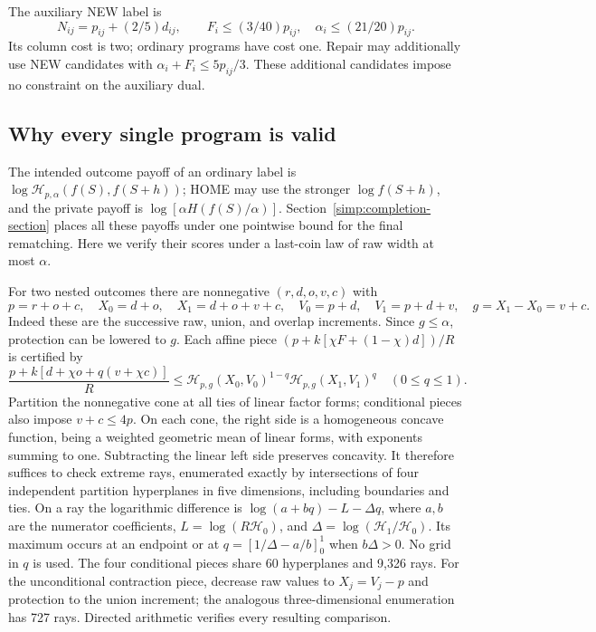 The auxiliary NEW label is
\begin{equation}\label{simp:new-score}
 N_{ij}=p_{ij}+(2/5)d_{ij},\qquad
 F_i\le(3/40)p_{ij},\quad\alpha_i\le(21/20)p_{ij}.
\end{equation}
Its column cost is two; ordinary programs have cost one.
Repair may additionally use NEW candidates with $\alpha_i+F_i\le5p_{ij}/3$.
These additional candidates impose no constraint on the auxiliary dual.

\subsection{Why every single program is valid}

The intended outcome payoff of an ordinary label is
$\log\mathcal H_{p,\alpha}(f(S),f(S+h))$; HOME may use the stronger
$\log f(S+h)$, and the private payoff is $\log[\alpha H(f(S)/\alpha)]$.
Section~\ref{simp:completion-section} places all these payoffs under one
pointwise bound for the final rematching. Here we verify their scores
under a last-coin law of raw width at most $\alpha$.

For two nested outcomes there are nonnegative $(r,d,o,v,c)$ with
\[
 p=r+o+c,\quad X_0=d+o,\quad X_1=d+o+v+c,\quad
 V_0=p+d,\quad V_1=p+d+v,\quad g=X_1-X_0=v+c.
\]
Indeed these are the successive raw, union, and overlap increments.
Since $g\le\alpha$, protection can be lowered to $g$. Each affine piece
$(p+k[\chi F+(1-\chi)d])/R$ is certified by
\begin{equation}\label{simp:two-point-test}
 \frac{p+k[d+\chi o+q(v+\chi c)]}{R}
 \le\mathcal H_{p,g}(X_0,V_0)^{1-q}\mathcal H_{p,g}(X_1,V_1)^q
 \quad(0\le q\le1).
\end{equation}
Partition the nonnegative cone at all ties of linear factor forms;
conditional pieces also impose $v+c\le4p$. On each cone, the right
side is a homogeneous concave function, being a weighted geometric mean
of linear forms, with exponents summing to one. Subtracting the linear
left side preserves concavity. It therefore suffices to check extreme
rays, enumerated exactly by intersections of four independent partition
hyperplanes in five dimensions, including boundaries and ties.
On a ray the logarithmic difference is $\log(a+bq)-L-\Delta q$,
where $a,b$ are the numerator coefficients,
$L=\log(R\mathcal H_0)$, and $\Delta=\log(\mathcal H_1/\mathcal H_0)$.
Its maximum occurs at an endpoint or at
$q=[1/\Delta-a/b]_0^1$ when $b\Delta>0$. No grid in $q$ is used.
The four conditional pieces share 60 hyperplanes and 9,326 rays.
For the unconditional contraction piece, decrease raw values to
$X_j=V_j-p$ and protection to the union increment; the analogous
three-dimensional enumeration has 727 rays.
Directed arithmetic verifies every resulting comparison.


